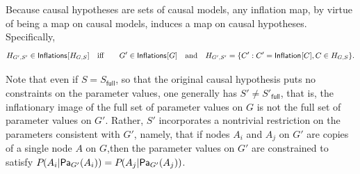 
Because causal hypotheses are sets of causal models, any inflation map, by virtue of being a map on causal models, induces a map on causal hypotheses. Specifically,
\begin{align}
H_{G',S'} \in \SmallNamedFunction{Inflations}{H_{G,S}} \quad \text{iff}\quad 
\quad G' \in\SmallNamedFunction{Inflations}{G}\quad \text{and} \quad 
H_{G',S'} = \{ C' : C' = \SmallNamedFunction{Inflation}{C}, C \in H_{G,S} \}.
\end{align}

Note that even if $S=S_{\textsf{full}}$, so that the original causal hypothesis puts no constraints on the parameter values, one generally has $S'\ne S'_{\textsf{full}}$, that is, the inflationary image of the full set of parameter values on $G$ is not the full set of parameter values on $G'$. Rather, $S'$ incorporates a nontrivial restriction on the parameters consistent with $G'$, namely, that if nodes $A_i$ and $A_j$ on $G'$ are copies of a single node $A$ on $G$,then the parameter values on $G'$ are constrained to satisfy $\pdf{A_i| \Pa[G']{A_i}}=\pdf{A_j|\Pa[G']{A_j}}$.




